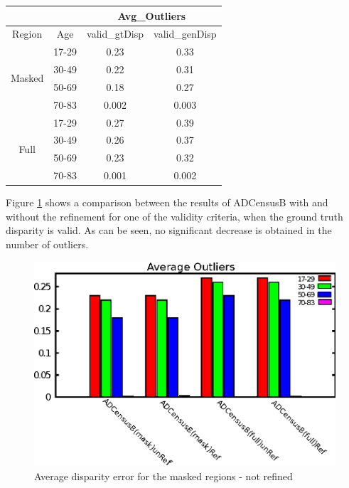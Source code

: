 \begin{minipage}{\linewidth}
\begin{center}
\label{tab:adcoutlNref}
\begin{tabular}{ |c|c|c|c| }
\hline
\multicolumn{2}{|c}{} & \multicolumn{2}{|c|}{Avg\_Outliers} \\
\hline
Region & Age &  valid\_gtDisp & valid\_genDisp \\ \hline
\multirow{4}{*}{Masked} & 17-29 & 0.23 & 0.33 \\
& 30-49 & 0.22 & 0.31 \\
& 50-69 & 0.18 & 0.27 \\
& 70-83 & 0.002 & 0.003 \\ \hline
\multirow{4}{*}{Full} & 17-29 & 0.27 & 0.39 \\
& 30-49 & 0.26 & 0.37 \\
& 50-69 & 0.23 & 0.32 \\
& 70-83 & 0.001 & 0.002 \\ \hline
\end{tabular}
\end{center}
\end{minipage} \newline \newline

Figure \ref{fig:outlnoref} shows a comparison between the results of ADCensusB with and without the refinement 
for one of the validity criteria, when the ground truth disparity is valid. As can be seen, no significant decrease is obtained in the number of outliers.

\begin{figure}[H]
\centering
\includegraphics[scale=0.95]{adcrefNoref}
\caption{Average disparity error for the masked regions - not refined}
\label{fig:outlnoref}
\end{figure} 

